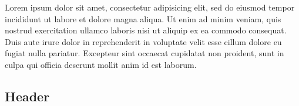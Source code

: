 \documentclass{article}
\begin{document}
Lorem ipsum dolor sit amet, consectetur adipisicing elit, sed do eiusmod tempor incididunt ut labore et dolore magna aliqua. Ut enim ad minim veniam, quis nostrud exercitation ullamco laboris nisi ut aliquip ex ea commodo consequat. Duis aute irure dolor in reprehenderit in voluptate velit esse cillum dolore eu fugiat nulla pariatur. Excepteur sint occaecat cupidatat non proident, sunt in culpa qui officia deserunt mollit anim id est laborum.

\subsection{Header}
\end{document}

